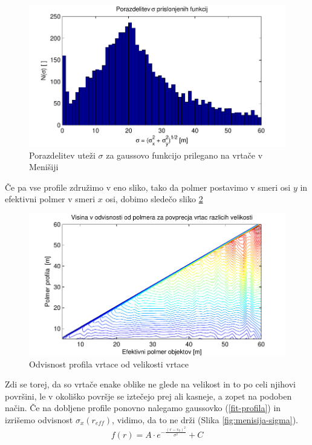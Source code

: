 \documentclass[a4paper, oneside, 12pt]{book}
\begin{document}
  \begin{figure}[H]
    \begin{center}
      \includegraphics{slike/menisija-sigme-hist}
    \end{center}
    \caption{Porazdelitev uteži $\sigma$ za gaussovo funkcijo prilegano na vrtače v Menišiji}
    \label{fig:menisija-sigme-hist}
  \end{figure}

  Če pa vse profile združimo v eno sliko, tako da polmer postavimo v smeri osi $y$ in efektivni polmer v smeri $x$ osi, dobimo sledečo sliko \ref{fig:menisija-profil-profilov}

  \begin{figure}[H]
    \centering
    \includegraphics{slike/menisija-profil-profilov}
    \caption{Odvisnost profila vrtace od velikosti vrtace}
    \label{fig:menisija-profil-profilov}
  \end{figure}

  Zdi se torej, da so vrtače enake oblike ne glede na velikost in to po celi njihovi površini, le v okoliško površje se iztečejo prej ali kasneje, a zopet na podoben način.
  Če na dobljene profile ponovno nalegamo gaussovko (\ref{fit-profila}) in izrišemo odvisnost $\sigma_x (r_{eff})$, vidimo, da to ne drži (Slika \ref{fig:menisija-sigma}).  
  \begin{equation}
    f(r) = A \cdot e^{-\frac{(r-r_0)^2}{\sigma^2}} + C  
    \label{fit-profila}
  \end{equation}
\end{document}
